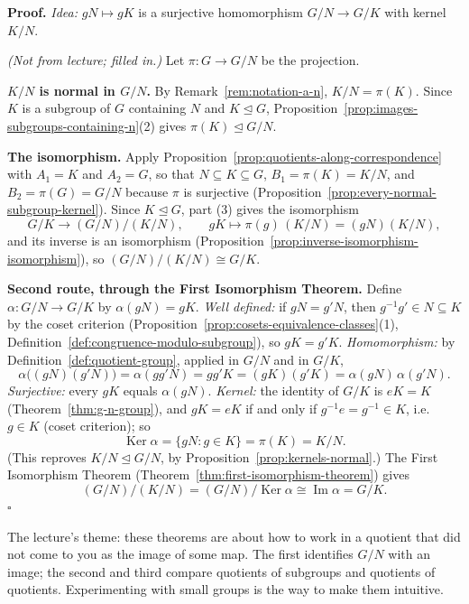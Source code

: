 \documentclass[11pt]{report}
\renewenvironment{proof}[1][Proof]{\noindent\textbf{#1.} }{\hfill$\square$\par\vspace{5pt}}
\begin{document}
\begin{proof}
\textit{Idea:} $gN \mapsto gK$ is a surjective homomorphism $G/N \to G/K$ with kernel $K/N$.\par
\textit{(Not from lecture; filled in.)} Let $\pi: G \to G/N$ be the projection.

\textbf{$K/N$ is normal in $G/N$.} By Remark~\ref{rem:notation-a-n}, $K/N = \pi(K)$. Since $K$ is a subgroup of $G$ containing $N$ and $K \trianglelefteq G$, Proposition~\ref{prop:images-subgroups-containing-n}(2) gives $\pi(K) \trianglelefteq G/N$.

\textbf{The isomorphism.} Apply Proposition~\ref{prop:quotients-along-correspondence} with $A_1 = K$ and $A_2 = G$, so that $N \subseteq K \subseteq G$, $B_1 = \pi(K) = K/N$, and $B_2 = \pi(G) = G/N$ because $\pi$ is surjective (Proposition~\ref{prop:every-normal-subgroup-kernel}). Since $K \trianglelefteq G$, part (3) gives the isomorphism
\[ G/K \to (G/N)/(K/N), \qquad gK \mapsto \pi(g)\,(K/N) = (gN)(K/N), \]
and its inverse is an isomorphism (Proposition~\ref{prop:inverse-isomorphism-isomorphism}), so $(G/N)/(K/N) \cong G/K$.

\textbf{Second route, through the First Isomorphism Theorem.} Define $\alpha: G/N \to G/K$ by $\alpha(gN) = gK$.
\emph{Well defined:} if $gN = g'N$, then $g^{-1}g' \in N \subseteq K$ by the coset criterion (Proposition~\ref{prop:cosets-equivalence-classes}(1), Definition~\ref{def:congruence-modulo-subgroup}), so $gK = g'K$.
\emph{Homomorphism:} by Definition~\ref{def:quotient-group}, applied in $G/N$ and in $G/K$,
\[ \alpha\big((gN)(g'N)\big) = \alpha(gg'N) = gg'K = (gK)(g'K) = \alpha(gN)\,\alpha(g'N). \]
\emph{Surjective:} every $gK$ equals $\alpha(gN)$.
\emph{Kernel:} the identity of $G/K$ is $eK = K$ (Theorem~\ref{thm:g-n-group}), and $gK = eK$ if and only if $g^{-1}e = g^{-1} \in K$, i.e.\ $g \in K$ (coset criterion); so
\[ \operatorname{Ker}\alpha = \{gN : g \in K\} = \pi(K) = K/N . \]
(This reproves $K/N \trianglelefteq G/N$, by Proposition~\ref{prop:kernels-normal}.) The First Isomorphism Theorem (Theorem~\ref{thm:first-isomorphism-theorem}) gives
\[ (G/N)/(K/N) = (G/N)/\operatorname{Ker}\alpha \cong \operatorname{Im}\alpha = G/K . \]
\end{proof}

\begin{rembox}\label{rem:isomorphism-theorems}
The lecture's theme: these theorems are about how to work in a quotient that did not come to you as the image of some map. The first identifies $G/N$ with an image; the second and third compare quotients of subgroups and quotients of quotients. Experimenting with small groups is the way to make them intuitive.
\end{rembox}
\end{document}
